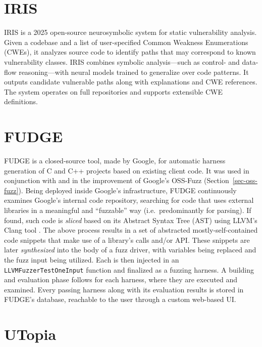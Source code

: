 \documentclass[
  a4paper,
]{scrreprt}
\theoremstyle{definition}
\theoremstyle{remark}
\begin{document}
\section{IRIS}\label{iris}

IRIS \autocite{iris} is a 2025 open-source neurosymbolic system for
static vulnerability analysis. Given a codebase and a list of
user-specified Common Weakness Enumerations (CWEs), it analyzes source
code to identify paths that may correspond to known vulnerability
classes. IRIS combines symbolic analysis---such as control- and
data-flow reasoning---with neural models trained to generalize over code
patterns. It outputs candidate vulnerable paths along with explanations
and CWE references. The system operates on full repositories and
supports extensible CWE definitions.

\section{FUDGE}\label{fudge}

FUDGE \autocite{fudge} is a closed-source tool, made by Google, for
automatic harness generation of C and C++ projects based on existing
client code. It was used in conjunction with and in the improvement of
Google's OSS-Fuzz \autocite{oss-fuzz} (Section~\ref{sec-oss-fuzz}).
Being deployed inside Google's infrastructure, FUDGE continuously
examines Google's internal code repository, searching for code that uses
external libraries in a meaningful and ``fuzzable'' way
(i.e.~predominantly for parsing). If found, such code is \emph{sliced}
\autocite{sasirekha2011Slicing} based on its Abstract Syntax Tree (AST)
using LLVM's Clang tool \autocite{llvm}. The above process results in a
set of abstracted mostly-self-contained code snippets that make use of a
library's calls and/or API. These snippets are later \emph{synthesized}
into the body of a fuzz driver, with variables being replaced and the
fuzz input being utilized. Each is then injected in an
\texttt{LLVMFuzzerTestOneInput} function and finalized as a fuzzing
harness. A building and evaluation phase follows for each harness, where
they are executed and examined. Every passing harness along with its
evaluation results is stored in FUDGE's database, reachable to the user
through a custom web-based UI.

\section{UTopia}\label{utopia}
\end{document}
